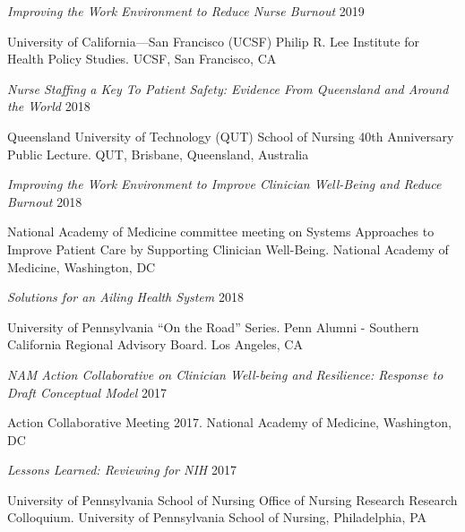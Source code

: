 \documentclass[10pt,]{article}
\begin{document}
{{{{{{{{{{{{{{{\begin{hangparas}{.5in}{1}

{\textit {Improving the Work Environment to Reduce Nurse Burnout}} \hfill 2019 
\vspace{-2.5mm}
\begin{adjustwidth}{0.5cm}{1cm}
University of California—San Francisco (UCSF) Philip R. Lee Institute for Health Policy Studies. UCSF, San Francisco, CA
\end{adjustwidth}

{\textit {Nurse Staffing a Key To Patient Safety: Evidence From Queensland and Around the World}} \hfill 2018 
\vspace{-2.5mm}
\begin{adjustwidth}{0.5cm}{1cm}
Queensland University of Technology (QUT) School of Nursing 40th Anniversary Public Lecture. QUT, Brisbane, Queensland, Australia
\end{adjustwidth}

{\textit {Improving the Work Environment to Improve Clinician Well-Being and Reduce Burnout}} \hfill 2018 
\vspace{-2.5mm}
\begin{adjustwidth}{0.5cm}{1cm}
National Academy of Medicine committee meeting on Systems Approaches to Improve Patient Care by Supporting Clinician Well-Being. National Academy of Medicine, Washington, DC
\end{adjustwidth}

{\textit {Solutions for an Ailing Health System}} \hfill 2018 
\vspace{-2.5mm}
\begin{adjustwidth}{0.5cm}{1cm}
University of Pennsylvania “On the Road” Series. Penn Alumni - Southern California Regional Advisory Board. Los Angeles, CA
\end{adjustwidth}

{\textit {NAM Action Collaborative on Clinician Well-being and Resilience: Response to Draft Conceptual Model}} \hfill 2017 
\vspace{-2.5mm}
\begin{adjustwidth}{0.5cm}{1cm}
Action Collaborative Meeting 2017. National Academy of Medicine, Washington, DC
\end{adjustwidth}

{\textit {Lessons Learned: Reviewing for NIH}} \hfill 2017 
\vspace{-2.5mm}
\begin{adjustwidth}{0.5cm}{1cm}
University of Pennsylvania School of Nursing Office of Nursing Research Research Colloquium. University of Pennsylvania School of Nursing, Philadelphia, PA
\end{adjustwidth}


\end{hangparas}}}}}}}}}}}}}}}}
\end{document}
